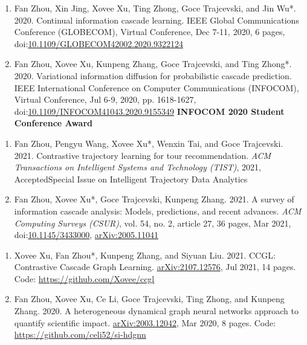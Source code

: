\begin{enumerate}[resume]
    \item Fan Zhou, Xin Jing, Xovee Xu, Ting Zhong, Goce Trajcevski, and Jin Wu*. 2020. Continual information cascade learning. IEEE Global Communications Conference (GLOBECOM), Virtual Conference, Dec 7-11, 2020, 6 pages, doi:\href{https://doi.org/10.1109/GLOBECOM42002.2020.9322124}{10.1109/GLOBECOM42002.2020.9322124}
    \item Fan Zhou, Xovee Xu, Kunpeng Zhang, Goce Trajcevski, and Ting Zhong*. 2020. Variational information diffusion for probabilistic cascade prediction. IEEE International Conference on Computer Communications (INFOCOM), Virtual Conference, Jul 6-9, 2020, pp. 1618-1627, doi:\href{https://doi.org/10.1109/INFOCOM41043.2020.9155349}{10.1109/INFOCOM41043.2020.9155349}
    \newline \textbf{\color{red}INFOCOM 2020 Student Conference Award}
\end{enumerate}


\begin{enumerate}[resume]
    \item Fan Zhou, Pengyu Wang, Xovee Xu*, Wenxin Tai, and Goce Trajcevski. 2021. Contrastive trajectory learning for tour recommendation. \textit{ACM Transactions on Intelligent Systems and Technology (TIST)}, 2021, Accepted\newline Special Issue on Intelligent Trajectory Data Analytics
    \item Fan Zhou, Xovee Xu*, Goce Trajcevski, Kunpeng Zhang. 2021. A survey of information cascade analysis: Models, predictions, and recent advances. \textit{ACM Computing Surveys (CSUR)}, vol. 54, no. 2, article 27, 36 pages, Mar 2021, doi:\href{https://xovee.cn/html/paper-redirects/csur2021.html}{10.1145/3433000}, \href{https://arxiv.org/abs/2005.11041}{arXiv:2005.11041}
\end{enumerate}


\begin{enumerate}[resume]
    \item Xovee Xu, Fan Zhou*, Kunpeng Zhang, and Siyuan Liu. 2021. CCGL: Contrastive Cascade Graph Learning. \href{https://arxiv.org/abs/2107.12576}{arXiv:2107.12576}, Jul 2021, 14 pages. \newline Code: {\color{gray}\url{https://github.com/Xovee/ccgl}}
    \item Fan Zhou, Xovee Xu, Ce Li, Goce Trajcevski, Ting Zhong, and Kunpeng Zhang. 2020. A heterogeneous dynamical graph neural networks approach to quantify scientific impact. \href{https://arxiv.org/abs/2003.12042}{arXiv:2003.12042}, Mar 2020, 8 pages. \newline Code: {\color{gray}\url{https://github.com/celi52/si-hdgnn}}
\end{enumerate}

